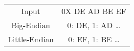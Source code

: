 \documentclass[a4paper]{article} \usepackage[backend=biber, style=numeric, sorting=none]{biblatex}
\begin{document}
\begin{multicols*}{4}
\vfill\null
\columnbreak
\begin{center}
\vspace{5mm} %

\vspace{5mm} %
\begin{tabular}{ |c c| } 
 \hline
 Input & 0X DE AD BE EF  \\ 
 Big-Endian & 0: DE, 1: AD \dots  \\ 
 Little-Endian & 0: EF, 1: BE \dots  \\ 
 \hline
\end{tabular}
\end{center}

    \end{multicols*}
\end{document}

